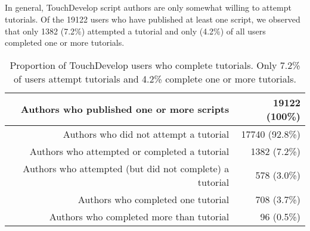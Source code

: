 
\subsection{\rqtutorial}


\def\numauthors{19122}%
\def\authorsNoUsedTutorials{17740}%
\def\authorsUsedTutorials{1382}%
\def\authorsZeroTutorials{578}%
\def\authorsOneTutorials{708}%
\def\authorsTwoTutorials{96}%

\def\totalcompletions{\FPeval\result{\authorsOneTutorials+\authorsTwoTutorials}%
\FPround\result{\result}{0}%
\result%
}

In general, TouchDevelop script authors are only somewhat willing to attempt tutorials.
Of the \numauthors{} users who have published at least one script, we observed that only \authorsUsedTutorials{} (7.2\%) attempted a tutorial and only \totalcompletions{} (4.2\%) of all users completed one or more tutorials.


\begin{table}
	\centering
	\begin{tabular}{rr}
		\toprule
		Authors who published one or more scripts & \numauthors{} (100\%)\\
		\midrule
		Authors who did not attempt a tutorial & \authorsNoUsedTutorials{} (92.8\%)\\
		Authors who attempted or completed a tutorial & \authorsUsedTutorials{} (7.2\%)\\
		\midrule
		Authors who attempted (but did not complete) a tutorial & \authorsZeroTutorials{} (3.0\%)\\
		Authors who completed one tutorial & \authorsOneTutorials{} (3.7\%)\\
		Authors who completed more than tutorial & \authorsTwoTutorials{} (0.5\%)\\
		\bottomrule
	\end{tabular}
	\caption{Proportion of TouchDevelop users who complete tutorials. Only 7.2\% of users attempt tutorials and 4.2\% complete one or more tutorials.}
	\label{tab:tutorial_completions}
\end{table}

